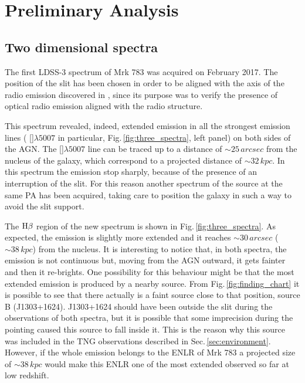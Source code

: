 \documentclass[../main.tex]{subfiles}
\begin{document}
\section{Preliminary Analysis}
\label{sec:analysis1_pap3}

\subsection{Two dimensional spectra}
\label{sec:2dspectra}



The first LDSS-3 spectrum of Mrk 783 was acquired on February 2017. 
The position of the slit has been chosen in order to be aligned with the axis of the radio emission discovered in \citep{Congiu17}, since its purpose was to verify the presence of optical radio emission aligned with the radio structure.

This spectrum revealed, indeed, extended emission in all the strongest emission lines ( []$\lambda5007$ in particular, Fig.\,\ref{fig:three_spectra}, left panel) on both sides of the AGN.
The []$\lambda5007$ line can be traced up to a distance of $\sim 25\,\si{arcsec}$ from the nucleus of the galaxy, which correspond to a projected distance of $\sim 32\,\si{kpc}$.
In this spectrum the emission stop sharply, because of the presence of an interruption of the slit.
For this reason another spectrum of the source at the same PA has been acquired, taking care to position the galaxy in such a way to avoid the slit support.

The $\rm H\beta$ region of the new spectrum is shown in Fig.\,\ref{fig:three_spectra}.
As expected, the emission is slightly more extended and it reaches $\sim 30\,\si{arcsec}$ ($\sim 38\,\si{kpc}$) from the nucleus.
It is interesting to notice that, in both spectra, the emission is not continuous but, moving from the AGN outward, it gets fainter and then it re-brights.
One possibility for this behaviour might be that the most extended emission is produced by a nearby source.
From Fig.\,\ref{fig:finding_chart} it is possible to see that there actually is a faint source close to that position, source B (J1303+1624).
J1303+1624 should have been outside the slit during the observations of both spectra, but it is possible that some imprecision during the pointing caused this source to fall inside it.
This is the reason why this source was included in the TNG observations described in Sec.\,\ref{sec:environment}.
However, if the whole emission belongs to the ENLR of Mrk 783 a projected size of $\sim 38\,\si{kpc}$ would make this ENLR one of the most extended observed so far at low redshift.
\end{document}
